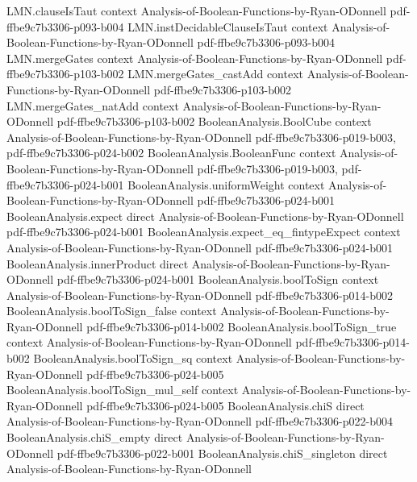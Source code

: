 \begin{theorem}
  {LMN.clauseIsTaut}
  {context}
  {Analysis-of-Boolean-Functions-by-Ryan-ODonnell}
  {pdf-ffbe9c7b3306-p093-b004}
\proofstep
  {LMN.instDecidableClauseIsTaut}
  {context}
  {Analysis-of-Boolean-Functions-by-Ryan-ODonnell}
  {pdf-ffbe9c7b3306-p093-b004}
\proofstep
  {LMN.mergeGates}
  {context}
  {Analysis-of-Boolean-Functions-by-Ryan-ODonnell}
  {pdf-ffbe9c7b3306-p103-b002}
\proofstep
  {LMN.mergeGates_castAdd}
  {context}
  {Analysis-of-Boolean-Functions-by-Ryan-ODonnell}
  {pdf-ffbe9c7b3306-p103-b002}
\proofstep
  {LMN.mergeGates_natAdd}
  {context}
  {Analysis-of-Boolean-Functions-by-Ryan-ODonnell}
  {pdf-ffbe9c7b3306-p103-b002}
\proofstep
  {BooleanAnalysis.BoolCube}
  {context}
  {Analysis-of-Boolean-Functions-by-Ryan-ODonnell}
  {pdf-ffbe9c7b3306-p019-b003,
    pdf-ffbe9c7b3306-p024-b002}
\proofstep
  {BooleanAnalysis.BooleanFunc}
  {context}
  {Analysis-of-Boolean-Functions-by-Ryan-ODonnell}
  {pdf-ffbe9c7b3306-p019-b003,
    pdf-ffbe9c7b3306-p024-b001}
\proofstep
  {BooleanAnalysis.uniformWeight}
  {context}
  {Analysis-of-Boolean-Functions-by-Ryan-ODonnell}
  {pdf-ffbe9c7b3306-p024-b001}
\proofstep
  {BooleanAnalysis.expect}
  {direct}
  {Analysis-of-Boolean-Functions-by-Ryan-ODonnell}
  {pdf-ffbe9c7b3306-p024-b001}
\proofstep
  {BooleanAnalysis.expect_eq_fintypeExpect}
  {context}
  {Analysis-of-Boolean-Functions-by-Ryan-ODonnell}
  {pdf-ffbe9c7b3306-p024-b001}
\proofstep
  {BooleanAnalysis.innerProduct}
  {direct}
  {Analysis-of-Boolean-Functions-by-Ryan-ODonnell}
  {pdf-ffbe9c7b3306-p024-b001}
\proofstep
  {BooleanAnalysis.boolToSign}
  {context}
  {Analysis-of-Boolean-Functions-by-Ryan-ODonnell}
  {pdf-ffbe9c7b3306-p014-b002}
\proofstep
  {BooleanAnalysis.boolToSign_false}
  {context}
  {Analysis-of-Boolean-Functions-by-Ryan-ODonnell}
  {pdf-ffbe9c7b3306-p014-b002}
\proofstep
  {BooleanAnalysis.boolToSign_true}
  {context}
  {Analysis-of-Boolean-Functions-by-Ryan-ODonnell}
  {pdf-ffbe9c7b3306-p014-b002}
\proofstep
  {BooleanAnalysis.boolToSign_sq}
  {context}
  {Analysis-of-Boolean-Functions-by-Ryan-ODonnell}
  {pdf-ffbe9c7b3306-p024-b005}
\proofstep
  {BooleanAnalysis.boolToSign_mul_self}
  {context}
  {Analysis-of-Boolean-Functions-by-Ryan-ODonnell}
  {pdf-ffbe9c7b3306-p024-b005}
\proofstep
  {BooleanAnalysis.chiS}
  {direct}
  {Analysis-of-Boolean-Functions-by-Ryan-ODonnell}
  {pdf-ffbe9c7b3306-p022-b004}
\proofstep
  {BooleanAnalysis.chiS_empty}
  {direct}
  {Analysis-of-Boolean-Functions-by-Ryan-ODonnell}
  {pdf-ffbe9c7b3306-p022-b001}
\proofstep
  {BooleanAnalysis.chiS_singleton}
  {direct}
  {Analysis-of-Boolean-Functions-by-Ryan-ODonnell}

\end{theorem}
